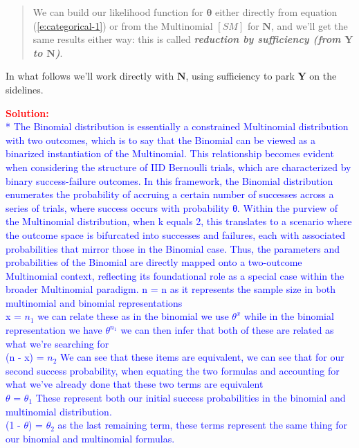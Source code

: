 \documentclass[12pt]{article}
\newcommand{\bi}[1]{\b{\i{#1}}}
\renewcommand{\b}[1]{\textbf{#1}}
\renewcommand{\i}[1]{\textit{#1}}
\begin{document}
\begin{itemize}
\begin{quote}

We can build our likelihood function for $\bm{ \theta }$ either directly from equation (\ref{e:categorical-1}) or from the Multinomial $[ SM ]$ for $\bm{ N }$, and we'll get the same results either way: this is called \bi{reduction by sufficiency (from $\bm{ Y }$ to $\bm{ N }$)}.

\end{quote}

In what follows we'll work directly with $\bm{ N }$, using sufficiency to park $\bm{ Y }$ on the sidelines.

\textcolor{red}{\textbf{Solution:}} \\
\textcolor{blue}{
* The Binomial distribution is essentially a constrained Multinomial distribution with two outcomes, which is to say that the Binomial can be viewed as a binarized instantiation of the Multinomial. This relationship becomes evident when considering the structure of IID Bernoulli trials, which are characterized by binary success-failure outcomes. In this framework, the Binomial distribution enumerates the probability of accruing a certain number of successes across a series of trials, where success occurs with probability θ. Within the purview of the Multinomial distribution, when k equals 2, this translates to a scenario where the outcome space is bifurcated into successes and failures, each with associated probabilities that mirror those in the Binomial case. Thus, the parameters and probabilities of the Binomial are directly mapped onto a two-outcome Multinomial context, reflecting its foundational role as a special case within the broader Multinomial paradigm.
n = n as it represents the sample size in both multinomial and binomial representations
\\
x = $n_1$  we can relate these as in the binomial we use $\theta^x$ while in the binomial representation we have $\theta^{n_1}$ we can then infer that both of these are related as what we're searching for
\\
(n - x) = $n_2$  We can see that these items are equivalent, we can see that for our second success probability, when equating the two formulas and accounting for what we've already done that these two terms are equivalent
\\
$\theta$ = $\theta_1$  These represent both our initial success probabilities in the binomial and multinomial distribution.
\\
(1 - $\theta$) = $\theta_2$ as the last remaining term, these terms represent the same thing for our binomial and multinomial formulas.\\ \\
}
\end{itemize}
\end{document}
